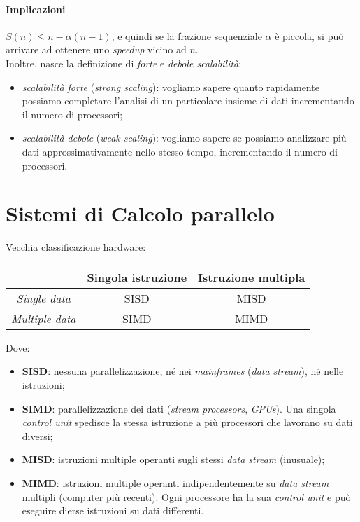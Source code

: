 \paragraph{Implicazioni}
$S(n) \leq n - \alpha (n-1)$, e quindi se la frazione sequenziale $\alpha$ è piccola, si può arrivare ad ottenere uno \textit{speedup} vicino ad $n$. \\
Inoltre, nasce la definizione di \textit{forte} e \textit{debole scalabilità}:
\begin{itemize}
	\item \textit{scalabilità forte} (\textit{strong scaling}): vogliamo sapere quanto rapidamente possiamo completare l'analisi di un particolare insieme di dati incrementando il numero di processori;
	\item \textit{scalabilità debole} (\textit{weak scaling}): vogliamo sapere se possiamo analizzare più dati approssimativamente nello stesso tempo, incrementando il numero di processori.
\end{itemize}

\section{Sistemi di Calcolo parallelo}
Vecchia classificazione hardware:
\begin{center}
	\begin{tabular}{| c | c | c |}
		\hline
		\textbf{} & \textbf{Singola istruzione} & \textbf{Istruzione multipla} \\ \hline
		\textit{Single data} & SISD & MISD \\
		\textit{Multiple data} & SIMD & MIMD \\
		\hline
	\end{tabular}
\end{center}
Dove:
\begin{itemize}
	\item \textbf{SISD}: nessuna parallelizzazione, né nei \textit{mainframes} (\textit{data stream}), né nelle istruzioni;
	\item \textbf{SIMD}: parallelizzazione dei dati (\textit{stream processors}, \textit{GPUs}). Una singola \textit{control unit} spedisce la stessa istruzione a più processori che lavorano su dati diversi;
	\item \textbf{MISD}: istruzioni multiple operanti sugli stessi \textit{data stream} (inusuale);
	\item \textbf{MIMD}: istruzioni multiple operanti indipendentemente su \textit{data stream} multipli (computer più recenti). Ogni processore ha la sua \textit{control unit} e può eseguire dierse istruzioni su dati differenti.
\end{itemize}

